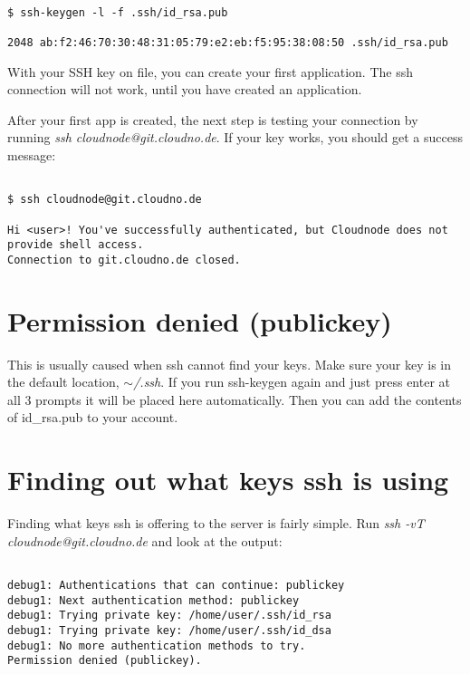 \begin{adjustwidth}{2.5em}{2.5em}
\begin{verbatim}

$ ssh-keygen -l -f .ssh/id_rsa.pub

2048 ab:f2:46:70:30:48:31:05:79:e2:eb:f5:95:38:08:50 .ssh/id_rsa.pub

\end{verbatim}
\end{adjustwidth}

With your SSH key on file, you can create your first application. The ssh connection will not work, until you have created an application.

After your first app is created, the next step is testing your connection by running \emph{ssh cloudnode@git.cloudno.de}. If your key works, you should get a success message:

\begin{adjustwidth}{2.5em}{2.5em}
\begin{verbatim}

$ ssh cloudnode@git.cloudno.de

Hi <user>! You've successfully authenticated, but Cloudnode does not provide shell access.
Connection to git.cloudno.de closed.

\end{verbatim}
\end{adjustwidth}

\section{Permission denied (publickey)}
\label{permissiondeniedpublickey}

This is usually caused when ssh cannot find your keys. Make sure your key is in the default location, \emph{\ensuremath{\sim}\slash .ssh}. If you run ssh-keygen again and just press enter at all 3 prompts it will be placed here automatically. Then you can add the contents of id\_rsa.pub to your account.

\section{Finding out what keys ssh is using}
\label{findingoutwhatkeyssshisusing}

Finding what keys ssh is offering to the server is fairly simple. Run \emph{ssh -vT cloudnode@git.cloudno.de} and look at the output:

\begin{adjustwidth}{2.5em}{2.5em}
\begin{verbatim}

debug1: Authentications that can continue: publickey
debug1: Next authentication method: publickey
debug1: Trying private key: /home/user/.ssh/id_rsa
debug1: Trying private key: /home/user/.ssh/id_dsa
debug1: No more authentication methods to try.
Permission denied (publickey).

\end{verbatim}
\end{adjustwidth}

